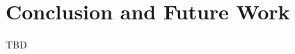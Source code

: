\documentclass[conference]{IEEEtran}
\newlength{\dummylen}
\newcommand{\NOTE}[1]{\setlength{\dummylen}{\fboxrule}\setlength{\fboxrule}{2pt}%
            \vspace{1ex}\noindent\hfill%
            \fbox{\begin{minipage}{.96\columnwidth}#1\end{minipage}}%
            \setlength{\fboxrule}{\dummylen}\hfill{}\vspace{1ex}}
\begin{document}





\section{Conclusion and Future Work}
\label{sec:concl}
TBD



\end{document}
